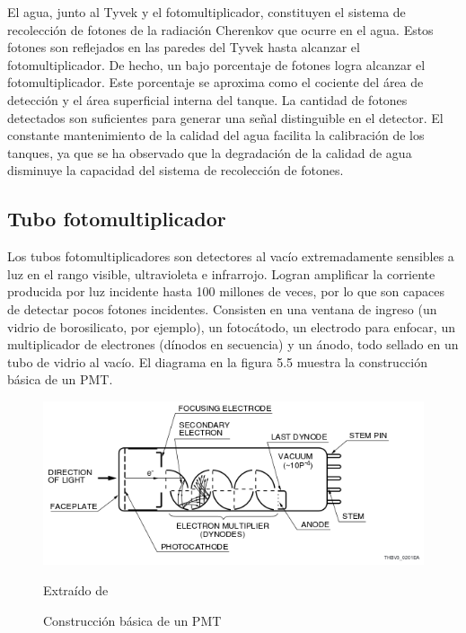 \documentclass{book}
\begin{document}
El agua, junto al Tyvek y el fotomultiplicador, constituyen el sistema de recolecci\'on de fotones de la radiaci\'on Cherenkov que ocurre en el agua. Estos fotones son reflejados en las paredes del Tyvek hasta alcanzar el fotomultiplicador. De hecho, un bajo porcentaje de fotones logra alcanzar el fotomultiplicador. Este porcentaje se aproxima como el cociente del \'area de detecci\'on y el \'area superficial interna del tanque. La cantidad de fotones detectados son suficientes para generar una se\~nal distinguible en el detector. El constante mantenimiento de la calidad del agua facilita la calibraci\'on de los tanques, ya que se ha observado que la degradaci\'on de la calidad de agua disminuye la capacidad del sistema de recolecci\'on de fotones. \citep{PEREZ}

\subsection{Tubo fotomultiplicador}

Los tubos fotomultiplicadores son detectores al vac\'io extremadamente sensibles a luz en el rango visible, ultravioleta e infrarrojo. Logran amplificar la corriente producida por luz incidente hasta 100 millones de veces, por lo que son capaces de detectar pocos fotones incidentes. Consisten en una ventana de ingreso (un vidrio de borosilicato, por ejemplo), un fotoc\'atodo, un electrodo para enfocar, un multiplicador de electrones (d\'inodos en secuencia) y un \'anodo, todo sellado en un tubo de vidrio al vac\'io. El diagrama en la figura 5.5 muestra la construcci\'on b\'asica de un PMT. \citep{Hamamatsu}

\begin{figure}[ht] %
\begin{center}
 \includegraphics[width =0.8\linewidth]{Hamamatsu.png}
 
 Extra\'ido de \citep{Hamamatsu}
\caption{Construcci\'on b\'asica de un PMT}
\end{center}
\end{figure}
\end{document}
